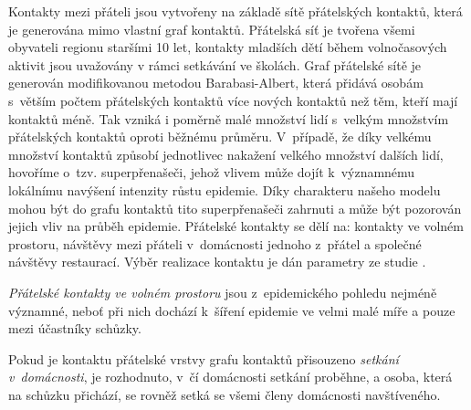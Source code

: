 



Kontakty mezi přáteli jsou vytvořeny na základě sítě přátelských kontaktů, která je generována mimo vlastní graf kontaktů. Přátelská síť je tvořena všemi obyvateli regionu staršími 10 let, kontakty mladších dětí během volnočasových aktivit jsou uvažovány v rámci setkávání ve školách. Graf přátelské sítě je generován modifikovanou metodou Barabasi-Albert, která přidává osobám s~větším počtem přátelských kontaktů více nových kontaktů než těm, kteří mají kontaktů méně. Tak vzniká i poměrně malé množství lidí s~velkým množstvím přátelských kontaktů oproti běžnému průměru. V~případě, že díky velkému množství kontaktů způsobí jednotlivec nakažení velkého množství dalších lidí, hovoříme o~tzv. superpřenašeči, jehož vlivem může dojít k~významnému lokálnímu navýšení intenzity růstu epidemie. Díky charakteru našeho modelu mohou být do grafu kontaktů tito superpřenašeči zahrnuti a může být pozorován jejich vliv na průběh epidemie.
Přátelské kontakty se dělí na: kontakty ve volném prostoru, návštěvy mezi přáteli v~domácnosti jednoho z~přátel a společné návštěvy restaurací. Výběr realizace kontaktu je dán parametry ze studie \cite{zaj:medianlife}.

\emph{Přátelské kontakty ve volném prostoru} jsou z~epidemického pohledu nejméně významné, neboť při nich dochází k~šíření epidemie ve velmi malé míře a pouze mezi účastníky schůzky.

Pokud je kontaktu přátelské vrstvy grafu kontaktů přisouzeno \emph{setkání v~domácnosti}, je rozhodnuto, v~čí domácnosti setkání proběhne, a osoba, která na schůzku přichází, se rovněž setká se všemi členy domácnosti navštíveného.


